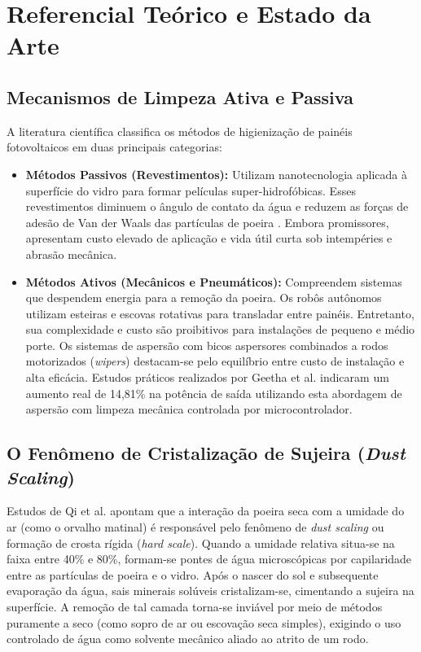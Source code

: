 \documentclass[12pt, a4paper]{article}
\begin{document}
\section{Referencial Teórico e Estado da Arte}

\subsection{Mecanismos de Limpeza Ativa e Passiva}

A literatura científica classifica os métodos de higienização de painéis fotovoltaicos em duas principais categorias:
\begin{itemize}
    \item \textbf{Métodos Passivos (Revestimentos):} Utilizam nanotecnologia aplicada à superfície do vidro para formar películas super-hidrofóbicas. Esses revestimentos diminuem o ângulo de contato da água e reduzem as forças de adesão de Van der Waals das partículas de poeira \cite{qi2025}. Embora promissores, apresentam custo elevado de aplicação e vida útil curta sob intempéries e abrasão mecânica.
    \item \textbf{Métodos Ativos (Mecânicos e Pneumáticos):} Compreendem sistemas que despendem energia para a remoção da poeira. Os robôs autônomos utilizam esteiras e escovas rotativas para transladar entre painéis. Entretanto, sua complexidade e custo são proibitivos para instalações de pequeno e médio porte. Os sistemas de aspersão com bicos aspersores combinados a rodos motorizados (\textit{wipers}) destacam-se pelo equilíbrio entre custo de instalação e alta eficácia. Estudos práticos realizados por Geetha et al. \cite{geetha2024} indicaram um aumento real de 14,81\% na potência de saída utilizando esta abordagem de aspersão com limpeza mecânica controlada por microcontrolador.
\end{itemize}

\subsection{O Fenômeno de Cristalização de Sujeira (\textit{Dust Scaling})}

Estudos de Qi et al. \cite{qi2025} apontam que a interação da poeira seca com a umidade do ar (como o orvalho matinal) é responsável pelo fenômeno de \textit{dust scaling} ou formação de crosta rígida (\textit{hard scale}). Quando a umidade relativa situa-se na faixa entre 40\% e 80\%, formam-se pontes de água microscópicas por capilaridade entre as partículas de poeira e o vidro. Após o nascer do sol e subsequente evaporação da água, sais minerais solúveis cristalizam-se, cimentando a sujeira na superfície. A remoção de tal camada torna-se inviável por meio de métodos puramente a seco (como sopro de ar ou escovação seca simples), exigindo o uso controlado de água como solvente mecânico aliado ao atrito de um rodo.
\end{document}
